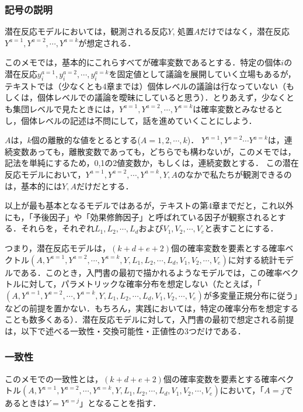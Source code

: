 \documentclass[12pt]{jsarticle}
\begin{document}
\subsubsection{記号の説明}
潜在反応モデルにおいては，観測される反応$Y$, 処置$A$だけではなく，潜在反応$Y^{a=1}, Y^{a=2}, \cdots,  Y^{a=k}$が想定される．

このメモでは，基本的にこれらすべてが確率変数であるとする．特定の個体$i$の潜在反応$y_{i}^{a=1}, y_{i}^{a=2}, \cdots,  y_{i}^{a=k}$を固定値として議論を展開していく立場もあるが，テキストでは（少なくとも4章までは）個体レベルの議論は行なっていない（もしくは，個体レベルでの議論を曖昧にしていると思う）．とりあえず，少なくとも集団レベルで見たときには，$Y^{a=1}, Y^{a=2}, \cdots,  Y^{a=k}$は確率変数とみなせるとし，個体レベルの記述は不問にして，話を進めていくことにしよう．



$A$は，$k$個の離散的な値をとるとする($A = 1,2,\cdots, k$)．
$Y^{a=1}, Y^{a=2} \cdots Y^{a=k}$は，連続変数あっても，離散変数であっても，どちらでも構わないが，このメモでは，記法を単純にするため，0,1の2値変数か，もしくは，連続変数とする．
この潜在反応モデルにおいて，$Y^{a=1}, Y^{a=2}, \cdots,  Y^{a=k}, Y, A$のなかで私たちが観測できるのは，基本的には$Y, A$だけだとする．

以上が最も基本となるモデルではあるが，テキストの第4章までだと，これ以外にも，「予後因子」や「効果修飾因子」と呼ばれている因子が観察されるとする．それらを，それぞれ$L_1, L_2, \cdots, L_d$および$V_1, V_2, \cdots, V_e$と表すことにする．

つまり，潜在反応モデルは，$(k+d+e+2)$個の確率変数を要素とする確率ベクトル$(A, Y^{a=1}, Y^{a=2}, \cdots, Y^{a=k}, Y, L_1, L_2, \cdots, L_d, V_1, V_2, \cdots, V_e)$に対する統計モデルである．このとき，入門書の最初で描かれるようなモデルでは，この確率ベクトルに対して，パラメトリックな確率分布を想定しない（たとえば，「$(A, Y^{a=1}, Y^{a=2}, \cdots, Y^{a=k}, Y, L_1, L_2, \cdots, L_d, V_1, V_2, \cdots, V_e)$が多変量正規分布に従う」などの前提を置かない．もちろん，実践においては，特定の確率分布を想定することも数多くある）．潜在反応モデルに対して，入門書の最初で想定される前提は，以下で述べる一致性・交換可能性・正値性の3つだけである．


\subsubsection{一致性}

このメモでの一致性とは，$(k+d+e+2)$個の確率変数を要素とする確率ベクトル$(A, Y^{a=1}, Y^{a=2}, \cdots, Y^{a=k}, Y, L_1, L_2, \cdots, L_d, V_1, V_2, \cdots, V_e)$において，「$A = j$であるときは$Y = Y^{a=j}$」となることを指す．
\end{document}
